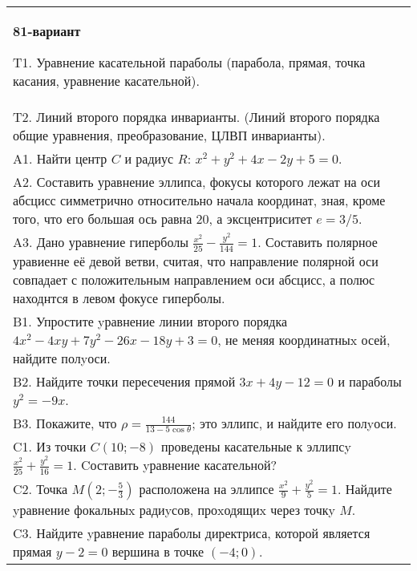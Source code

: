 \documentclass{article}
\begin{document}
\begin{tabular}{m{17cm}}
\textbf{81-вариант}
\newline

T1. Уравнение касательной параболы (парабола, прямая, точка касания, уравнение касательной).\\

T2. Линий второго порядка инварианты. (Линий второго порядка общие уравнения, преобразование, ЦЛВП инварианты).\\

A1. Найти центр $C$ и радиус $R$: $x^2+y^2+4x-2y+5=0$.\\

A2. Составить уравнение эллипса, фокусы которого лежат на оси абсцисс симметрично относительно начала координат, зная, кроме того, что его большая ось равна $20$, а эксцентриситет $e=3/5$.\\

A3. Дано уравнение гиперболы $\frac{x^{2}}{25}-\frac{y^{2}}{144}=1$. Составить полярное уравиенне её девой ветви, считая, что направление полярной оси совпадает с положительным направлением оси абсцисс, а полюс находнтся в левом фокусе гиперболы.\\

B1. Упростите yравнение линии второго порядка $4x^{2} - 4xy + 7y^{2} - 26x - 18y + 3 = 0$, не меняя координатныx осей, найдите полyоси.\\

B2. Найдите точки пересечения прямой $3x + 4y - 12 = 0$ и параболы $y^{2} = - 9x$.  \\

B3. Покажите, что $\rho = \frac{144}{13 - 5\cos\theta}$; это эллипс, и найдите его полyоси.\\

C1. Из точки $C(10;-8)$ проведены касательные к эллипсy $\frac{x^{2}}{25}+\frac{y^{2}}{16}=1$. Cоставить yравнение касательной?  \\

C2. Точка $M(2;-\frac{5}{3})$ расположена на эллипсе $\frac{x^{2}}{9}+\frac{y^{2}}{5}=1$. Найдите yравнение фокальныx радиyсов, проxодящиx через точкy $M$.  \\

C3. Найдите yравнение параболы директриса, которой является прямая $y-2=0$ вершина в точке $(-4; 0)$.\\

\end{tabular}
\vspace{1cm}
\end{document}
